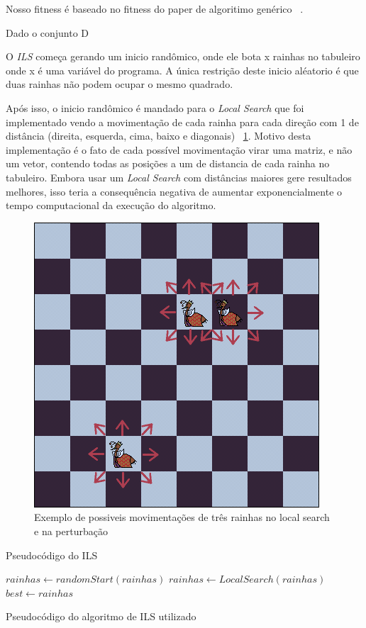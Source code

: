 \documentclass[
	article,			%
	11pt,				%
	oneside,			%
	a4paper,			%
	english,			%
	brazil,				%
	sumario=tradicional
	]{abntex2}
\begin{document}
Nosso fitness é baseado no fitness do paper de algoritimo genérico ~\cite{alharbi2017genetic}.

Dado o conjunto D

O \textit{ILS} começa gerando um inicio randômico, onde ele bota x rainhas no tabuleiro onde x é uma variável do programa. A única restrição deste inicio aléatorio é que duas rainhas não podem ocupar o mesmo quadrado.

Após isso, o inicio randômico é mandado para o \textit{Local Search} que foi implementado vendo a movimentação de cada rainha para cada direção com 1 de distância (direita, esquerda, cima, baixo e diagonais) ~\ref{possiveisMovimentacoes}. Motivo desta implementação é o fato de cada possível movimentação virar uma matriz, e não um vetor, contendo todas as posições a um de distancia de cada rainha no tabuleiro. Embora usar um \textit{Local Search} com distâncias maiores gere resultados melhores, isso teria a consequência negativa de aumentar exponencialmente o tempo computacional da execução do algoritmo.

\begin{figure}
  \centering
  \includegraphics[width=0.60\linewidth]{possiveisMovimentacoes.png}
  \caption{Exemplo de possiveis movimentações de três rainhas no local search e na perturbação}
  \label{possiveisMovimentacoes}
\end{figure}

Pseudocódigo do ILS
\begin{algorithm}
  $rainhas \gets randomStart(rainhas)$\;
  $rainhas \gets Local Search(rainhas)$\;
  $best \gets rainhas$\;
  \label{pseudoILS}
  \caption{Pseudocódigo do algoritmo de ILS utilizado}
 \end{algorithm}
\end{document}
